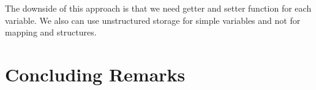 The downside of this approach is that we need getter and setter function for each variable. We also can use unstructured storage for simple variables and not for mapping and structures.


\section{Concluding Remarks}




